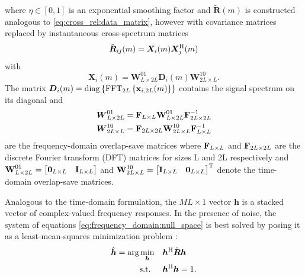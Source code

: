 \documentclass{article}
\newcommand{\x}{\mtxb{x}}
\newcommand{\hf}{{\bm{h}}}
\newcommand{\Rf}{{\bm{{R}}}}
\begin{document}
where \(\eta \in [0,1]\) is an exponential smoothing factor and \(\tilde{\Rf}(m)\) is constructed analogous to \eqref{eq:cross_rel:data_matrix}, however with covariance matrices replaced by instantaneous cross-spectrum matrices 
\begin{equation}
    \tilde{\Rf}_{ij}(m) = \bm{X}_{i} (m) \bm{X}_{j}^\herm (m)
\end{equation}
with 
\begin{equation}
    \bm{X}_{i}(m) = \bm{{W}}^{01}_{L \times 2L} \bm{{D}}_{i}(m) \bm{{W}}^{10}_{2L \times L}.
\end{equation}
The matrix \(\bm{{D}}_{i}(m) = \operatorname{diag} \left\{ \operatorname{FFT}_{2L} \left\{ \x_{i,2L}(m) \right\} \right\}\) contains the  signal spectrum on its diagonal and
\begin{align}
    \bm{{W}}_{L \times 2L}^{01} &= \bm{\mathrm{F}}_{L \times L} \bm{\mathrm{W}}_{L \times 2L}^{01} \bm{\mathrm{F}}_{2L \times 2L}^{-1}\\
    \bm{{W}}_{2L \times L}^{10} &= \bm{\mathrm{F}}_{2L \times 2L} \bm{\mathrm{W}}_{2L \times L}^{10} \bm{\mathrm{F}}_{L \times L}^{-1}
\end{align} are the frequency-domain overlap-save matrices where \(\bm{\mathrm{F}}_{L \times L}\) and \(\bm{\mathrm{F}}_{2L \times 2L}\) are the discrete Fourier transform (DFT) matrices for sizes L and 2L respectively and \(
    \bm{\mathrm{W}}_{L \times 2L}^{01} = \begin{bmatrix}
        \bm{\mathrm{0}}_{L \times L} & \bm{\mathrm{I}}_{L \times L}
    \end{bmatrix}\)
    and \(
    \bm{\mathrm{W}}_{2L \times L}^{10} = \begin{bmatrix}
        \bm{\mathrm{I}}_{L \times L} & \bm{\mathrm{0}}_{L \times L}
    \end{bmatrix}^{\mathrm{T}}\)
denote the time-domain overlap-save matrices.

Analogous to the time-domain formulation, the \(ML \times 1\) vector \(\hf\) is a stacked vector of complex-valued frequency responses.
In the presence of noise, the system of equations \eqref{eq:frequency_domain:null_space} is best solved by posing it as a least-mean-squares minimization problem \cite{guanghanxuLeastsquaresApproachBlind1995,huangAdaptiveMultichannelLeast2002}:
\begin{align}
    \hat{\hf} = \arg \min_{\hf} \quad &\hf^\herm \hat{\Rf} \hf \label{eq:frequency_domain:min_prob}\\
    \text{s.t. } \quad &\hf^\herm \hf = 1.
\end{align}
\end{document}
